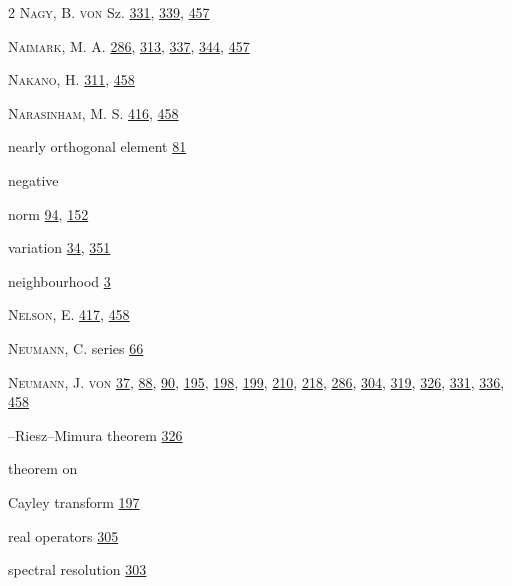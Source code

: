 \begin{multicols}{2}
\noindent \textsc{Nagy}, B. \textsc{von} Sz. \hyperlink{page.331}{331}, \hyperlink{page.339}{339}, \hyperlink{page.457}{457}\par
\noindent \textsc{Naimark}, M. A. \hyperlink{page.286}{286}, \hyperlink{page.313}{313}, \hyperlink{page.337}{337}, \hyperlink{page.344}{344}, \hyperlink{page.457}{457}\par
\noindent \textsc{Nakano}, H. \hyperlink{page.311}{311}, \hyperlink{page.458}{458}\par
\noindent \textsc{Narasinham}, M. S. \hyperlink{page.416}{416}, \hyperlink{page.458}{458}\par
\noindent nearly orthogonal element \hyperlink{page.81}{81}\par
\noindent negative\par
\hspace*{1.1em}norm \hyperlink{page.94}{94}, \hyperlink{page.152}{152}\par
\hspace*{1.1em}variation \hyperlink{page.34}{34}, \hyperlink{page.351}{351}\par
\noindent neighbourhood \hyperlink{page.3}{3}\par
\noindent \textsc{Nelson}, E. \hyperlink{page.417}{417}, \hyperlink{page.458}{458}\par
\noindent \textsc{Neumann}, C. series \hyperlink{page.66}{66}\par
\noindent \textsc{Neumann}, J. \textsc{von} \hyperlink{page.37}{37}, \hyperlink{page.88}{88}, \hyperlink{page.90}{90}, \hyperlink{page.195}{195}, \hyperlink{page.198}{198}, \hyperlink{page.199}{199}, \hyperlink{page.210}{210}, \hyperlink{page.218}{218}, \hyperlink{page.286}{286}, \hyperlink{page.304}{304}, \hyperlink{page.319}{319}, \hyperlink{page.326}{326}, \hyperlink{page.331}{331}, \hyperlink{page.336}{336}, \hyperlink{page.458}{458}\par
\hspace*{1.1em}--Riesz--Mimura theorem \hyperlink{page.326}{326}\par
\hspace*{1.1em}theorem on\par
\hspace*{2.2em}Cayley transform \hyperlink{page.197}{197}\par
\hspace*{2.2em}real operators \hyperlink{page.305}{305}\par
\hspace*{2.2em}spectral resolution \hyperlink{page.303}{303}\par

\end{multicols}
